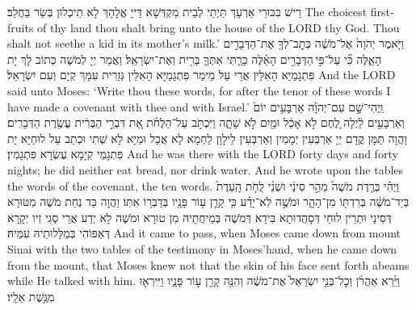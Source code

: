 {{רֵישׁ בִּכּוּרֵי אַרְעָךְ תַּיְתֵי לְבֵית מַקְדְּשָׁא דַּייָ אֱלָהָךְ לָא תֵיכְלוּן בְּשַׂר בַּחֲלַב׃}
{The choicest first-fruits of thy land thou shalt bring unto the house of the LORD thy God. Thou shalt not seethe a kid in its mother’s milk.’}{}
{וַיֹּ֤אמֶר יְהֹוָה֙ אֶל־מֹשֶׁ֔ה כְּתׇב־לְךָ֖ אֶת־הַדְּבָרִ֣ים הָאֵ֑לֶּה כִּ֞י עַל־פִּ֣י \legarmeh  הַדְּבָרִ֣ים הָאֵ֗לֶּה כָּרַ֧תִּי אִתְּךָ֛ בְּרִ֖ית וְאֶת־יִשְׂרָאֵֽל׃
}
{וַאֲמַר יְיָ לְמֹשֶׁה כְּתוֹב לָךְ יָת פִּתְגָמַיָּא הָאִלֵּין אֲרֵי עַל מֵימַר פִּתְגָמַיָּא הָאִלֵּין גְּזַרִית עִמָּךְ קְיָם וְעִם יִשְׂרָאֵל׃}
{And the LORD said unto Moses: ‘Write thou these words, for after the tenor of these words I have made a covenant with thee and with Israel.’}{}
{וַֽיְהִי־שָׁ֣ם עִם־יְהֹוָ֗ה אַרְבָּעִ֥ים יוֹם֙ וְאַרְבָּעִ֣ים לַ֔יְלָה לֶ֚חֶם לֹ֣א אָכַ֔ל וּמַ֖יִם לֹ֣א שָׁתָ֑ה וַיִּכְתֹּ֣ב עַל־הַלֻּחֹ֗ת אֵ֚ת דִּבְרֵ֣י הַבְּרִ֔ית עֲשֶׂ֖רֶת הַדְּבָרִֽים׃}
{וַהֲוָה תַּמָּן קֳדָם יְיָ אַרְבְּעִין יְמָמִין וְאַרְבְּעִין לֵילָוָן לַחְמָא לָא אֲכַל וּמַיָּא לָא שְׁתִי וּכְתַב עַל לוּחַיָּא יָת פִּתְגָמֵי קְיָמָא עֶשְׂרָא פִּתְגָמִין׃}
{And he was there with the LORD forty days and forty nights; he did neither eat bread, nor drink water. And he wrote upon the tables the words of the covenant, the ten words.}{}
{וַיְהִ֗י בְּרֶ֤דֶת מֹשֶׁה֙ מֵהַ֣ר סִינַ֔י וּשְׁנֵ֨י לֻחֹ֤ת הָֽעֵדֻת֙ בְּיַד־מֹשֶׁ֔ה בְּרִדְתּ֖וֹ מִן־הָהָ֑ר וּמֹשֶׁ֣ה לֹֽא־יָדַ֗ע כִּ֥י קָרַ֛ן ע֥וֹר פָּנָ֖יו בְּדַבְּר֥וֹ אִתּֽוֹ׃
}
{וַהֲוָה כַּד נְחַת מֹשֶׁה מִטּוּרָא דְּסִינַי וּתְרֵין לוּחֵי דְּסָהֲדוּתָא בִּידָא דְּמֹשֶׁה בְּמֵיחֲתֵיהּ מִן טוּרָא וּמֹשֶׁה לָא יְדַע אֲרֵי סְגִי זִיו יְקָרָא דְּאַפּוֹהִי בְּמַלָּלוּתֵיהּ עִמֵּיהּ׃}
{And it came to pass, when Moses came down from mount Sinai with the two tables of the testimony in Moses’hand, when he came down from the mount, that Moses knew not that the skin of his face sent forth abeams while He talked with him.}{}
{וַיַּ֨רְא אַהֲרֹ֜ן וְכׇל־בְּנֵ֤י יִשְׂרָאֵל֙ אֶת־מֹשֶׁ֔ה וְהִנֵּ֥ה קָרַ֖ן ע֣וֹר פָּנָ֑יו וַיִּֽירְא֖וּ מִגֶּ֥שֶׁת אֵלָֽיו׃
}
}
